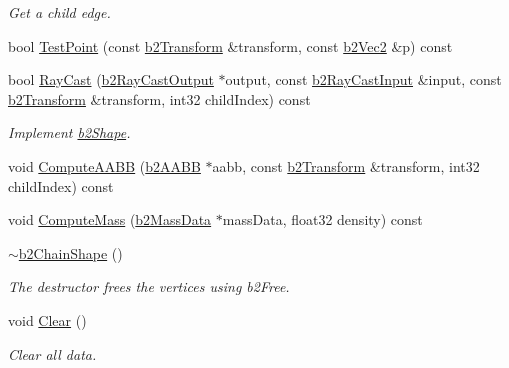\begin{DoxyCompactItemize}
\begin{DoxyCompactList}\small\item\em Get a child edge. \end{DoxyCompactList}\item 
bool \hyperlink{classb2ChainShape_a2d2d59b49c2611ad65ed68b0943d642d}{Test\+Point} (const \hyperlink{structb2Transform}{b2\+Transform} \&transform, const \hyperlink{structb2Vec2}{b2\+Vec2} \&p) const
\item 
\mbox{\label{classb2ChainShape_a2ca535a3b3d1e54f5572a3ee617dac19}} 
bool \hyperlink{classb2ChainShape_a2ca535a3b3d1e54f5572a3ee617dac19}{Ray\+Cast} (\hyperlink{structb2RayCastOutput}{b2\+Ray\+Cast\+Output} $\ast$output, const \hyperlink{structb2RayCastInput}{b2\+Ray\+Cast\+Input} \&input, const \hyperlink{structb2Transform}{b2\+Transform} \&transform, int32 child\+Index) const
\begin{DoxyCompactList}\small\item\em Implement \hyperlink{classb2Shape}{b2\+Shape}. \end{DoxyCompactList}\item 
void \hyperlink{classb2ChainShape_a612caee9cc6a62dec501a6b6059c13a8}{Compute\+A\+A\+BB} (\hyperlink{structb2AABB}{b2\+A\+A\+BB} $\ast$aabb, const \hyperlink{structb2Transform}{b2\+Transform} \&transform, int32 child\+Index) const
\item 
void \hyperlink{classb2ChainShape_a55efeb6d4005c1ca4b01cbcc5d7369db}{Compute\+Mass} (\hyperlink{structb2MassData}{b2\+Mass\+Data} $\ast$mass\+Data, float32 density) const
\item 
\mbox{\label{classb2ChainShape_a8c032394f5a85e7fc425a437e7689a18}} 
\hyperlink{classb2ChainShape_a8c032394f5a85e7fc425a437e7689a18}{$\sim$b2\+Chain\+Shape} ()
\begin{DoxyCompactList}\small\item\em The destructor frees the vertices using b2\+Free. \end{DoxyCompactList}\item 
\mbox{\label{classb2ChainShape_a434d4b61ab15726302ec5ad484011c33}} 
void \hyperlink{classb2ChainShape_a434d4b61ab15726302ec5ad484011c33}{Clear} ()
\begin{DoxyCompactList}\small\item\em Clear all data. \end{DoxyCompactList}\item 

\end{DoxyCompactItemize}
